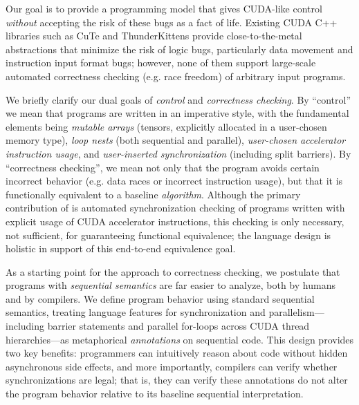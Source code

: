 Our goal is to provide a programming model that gives CUDA-like control \emph{without} accepting the risk of these bugs as a fact of life.
Existing CUDA C++ libraries such as CuTe \cite{cute} and ThunderKittens \cite{thunderkittens} provide close-to-the-metal abstractions that minimize the risk of logic bugs, particularly data movement and instruction input format bugs; however, none of them support large-scale automated correctness checking (e.g. race freedom) of arbitrary input programs.

We briefly clarify our dual goals of \emph{control} and \emph{correctness checking}.
By ``control'' we mean that programs are written in an imperative style, with the fundamental elements being
\emph{mutable arrays} (tensors, explicitly allocated in a user-chosen memory type),
\emph{loop nests} (both sequential and parallel),
\emph{user-chosen accelerator instruction usage},
and \emph{user-inserted synchronization} (including split barriers).
By ``correctness checking'', we mean not only that the program avoids certain incorrect behavior (e.g. data races or incorrect instruction usage),
but that it is functionally equivalent to a baseline \emph{algorithm}.
Although the primary contribution of \sporkName{} is automated synchronization checking of programs written with explicit usage of CUDA accelerator instructions,
this checking is only necessary, not sufficient, for guaranteeing functional equivalence;
the language design is holistic in support of this end-to-end equivalence goal.

As a starting point for the \sporkName{} approach to correctness checking, we postulate that programs with \emph{sequential semantics} are far easier to analyze, both by humans and by compilers.
We define program behavior using standard sequential semantics, treating language features for synchronization and parallelism---including barrier statements and parallel for-loops across CUDA thread hierarchies---as metaphorical \emph{annotations} on sequential code.
This design provides two key benefits: programmers can intuitively reason about code without hidden asynchronous side effects, and more importantly, compilers can verify whether synchronizations are legal; that is, they can verify these annotations do not alter the program behavior relative to its baseline sequential interpretation.

